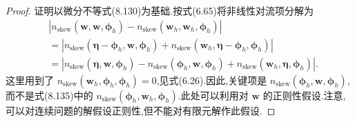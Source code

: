 \begin{theorem}
\begin{proof}
证明以微分不等式(8.130)为基础.按式(6.65)将非线性对流项分解为
\[
\begin{aligned}
&\left|
 n_{\mathrm{skew}}(\bm{w},\bm{w},\symbf{\phi}_h)
 -n_{\mathrm{skew}}(\bm{w}_h,\bm{w}_h,\symbf{\phi}_h)
 \right|\\
&=\left|
 n_{\mathrm{skew}}(\symbf{\eta}-\symbf{\phi}_h,
                        \bm{w},\symbf{\phi}_h)
 +n_{\mathrm{skew}}(\bm{w}_h,
                        \symbf{\eta}-\symbf{\phi}_h,\symbf{\phi}_h)
 \right|\\
&=\left|
 n_{\mathrm{skew}}(\symbf{\eta},\bm{w},\symbf{\phi}_h)
 -n_{\mathrm{skew}}(\symbf{\phi}_h,\bm{w},\symbf{\phi}_h)
 +n_{\mathrm{skew}}(\bm{w}_h,\symbf{\eta},\symbf{\phi}_h)
 \right|.
\end{aligned}
\]
这里用到了 $n_{\mathrm{skew}}(\bm{w}_h,\symbf{\phi}_h,\symbf{\phi}_h)=0$,见式(6.26).因此,关键项是
$n_{\mathrm{skew}}(\symbf{\phi}_h,\bm{w},\symbf{\phi}_h)$,而不是式(8.135)中的
$n_{\mathrm{skew}}(\symbf{\phi}_h,\bm{w}_h,\symbf{\phi}_h)$.此处可以利用对
$\bm{w}$ 的正则性假设.注意,可以对连续问题的解假设正则性,但不能对有限元解作此假设.


\end{proof}
\end{theorem}
